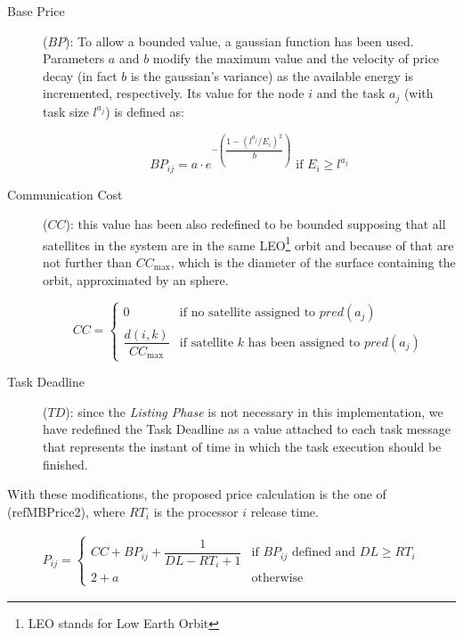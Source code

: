 \begin{description}
\item[Base Price] ($ BP $): To allow a bounded value, a gaussian function has been used. Parameters $a$ and $b$ modify the maximum value and the velocity of price decay (in fact $b$ is the gaussian's variance) as the available energy is incremented, respectively. Its value for the node $i$ and the task $a_j$ (with task size $l^{a_{j}}$) is defined as:

\begin{equation}
BP_{ij} = a\cdot e^{-\left(\dfrac{1-\left(l^{a_{j}} / E_i\right)^2}{b}\right)}\text{ if } E_i \geq l^{a_{j}}
\end{equation}

\item[Communication Cost] ($ CC $): this value has been also redefined to be bounded supposing that all satellites in the system are in the same LEO\footnote{LEO stands for Low Earth Orbit} orbit and because of that are not further than $CC_{\text{max}}$, which is the diameter of the surface containing the orbit, approximated by an sphere.

\begin{equation}
CC = \begin{cases} 0 & \text{if no satellite assigned to }pred(a_j)\\
\dfrac{d(i,k)}{CC_{\text{max}}} & \text{if satellite } k \text{ has been assigned to }pred(a_j)\end{cases}
\end{equation}

\item[Task Deadline] ($ TD $): since the \emph{Listing Phase} is not necessary in this implementation, we have redefined the Task Deadline as a value attached to each task message that represents the instant of time in which the task execution should be finished.
\end{description}

With these modifications, the proposed price calculation is the one of (ref{MBPrice2}), where $RT_i$ is the processor $i$ release time.

\begin{eqnarray}
\label{MBPrice2}
P_{ij} = \begin{cases}CC + BP_{ij} + \dfrac{1}{DL - RT_i + 1} & \text{if } BP_{ij} \text{ defined and } DL \geq RT_i\\
2 + a & \text{otherwise}\end{cases}
\end{eqnarray}


